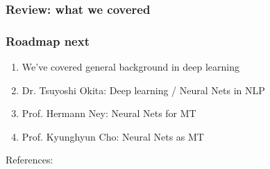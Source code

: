 \documentclass{beamer}
\newcommand{\be}{\begin{enumerate}}
\newcommand{\ee}{\end{enumerate}}
\begin{document}








\begin{frame}
\small{
\frametitle{Review: what we covered}
\tableofcontents
}
\end{frame}

\begin{frame}
\frametitle{Roadmap next}
\be
\item We've covered general background in deep learning
\item {\color{red} Dr. Tsuyoshi Okita}: Deep learning / Neural Nets in NLP
\item {\color{red} Prof. Hermann Ney}: Neural Nets for MT
\item {\color{red} Prof. Kyunghyun Cho}: Neural Nets as MT
\ee
\end{frame}
\begin{frame}[allowframebreaks]
\begin{tiny}
References:


\end{tiny}
\end{frame}
\end{document}
